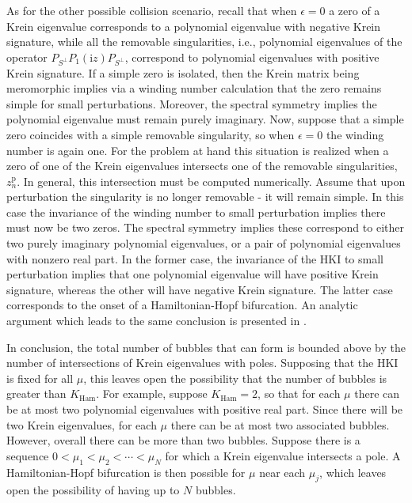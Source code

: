 \documentclass[review,onefignum,onetabnum]{siamart171218}
\def\Ham{\mathop\mathrm{Ham}\nolimits}
\newcommand{\rmi}{\mathrm{i}}
\newcommand{\rmp}{\mathrm{p}}
\begin{document}
As for the other possible collision scenario, recall that when $\epsilon=0$ a
zero of a Krein eigenvalue corresponds to a polynomial eigenvalue with
negative Krein signature, while all the removable singularities, i.e.,
polynomial eigenvalues of the operator $P_{S^\perp}P_1(\rmi z)P_{S^\perp}$,
correspond to polynomial eigenvalues with positive Krein signature. If a
simple zero is isolated, then the Krein matrix being meromorphic implies via
a winding number calculation that the zero remains simple for small
perturbations. Moreover, the spectral symmetry implies the polynomial
eigenvalue must remain purely imaginary. Now, suppose that a simple zero
coincides with a simple removable singularity, so when $\epsilon=0$ the
winding number is again one. For the problem at hand this situation is
realized when a zero of one of the Krein eigenvalues intersects one of the
removable singularities, $z_n^\rmp$. In general, this intersection must be
computed numerically. Assume that upon perturbation the singularity is no
longer removable - it will remain simple. In this case the invariance of the
winding number to small perturbation implies there must now be two zeros. The
spectral symmetry implies these correspond to either two purely imaginary
polynomial eigenvalues, or a pair of polynomial eigenvalues with nonzero real
part. In the former case, the invariance of the HKI to small perturbation
implies that one polynomial eigenvalue will have positive Krein signature,
whereas the other will have negative Krein signature. The latter case
corresponds to the onset of a Hamiltonian-Hopf bifurcation. An analytic
argument which leads to the same conclusion is presented in
\cite[Section~2.4]{kapitula:tks10}.

In conclusion, the total number of bubbles that can form is bounded above by
the number of intersections of Krein eigenvalues with poles. Supposing that
the HKI is fixed for all $\mu$, this leaves open the possibility that the
number of bubbles is greater than $K_{\Ham}$.  For example, suppose
$K_{\Ham}=2$, so that for each $\mu$ there can be at most two polynomial
eigenvalues with positive real part. Since there will be two Krein
eigenvalues, for each $\mu$ there can be at most two associated bubbles.
However, overall there can be more than two bubbles. Suppose there is a
sequence $0<\mu_1<\mu_2<\cdots<\mu_N$ for which a Krein eigenvalue intersects
a pole. A Hamiltonian-Hopf bifurcation is then possible for $\mu$ near each
$\mu_j$, which leaves open the possibility of having up to $N$ bubbles.
\end{document}
